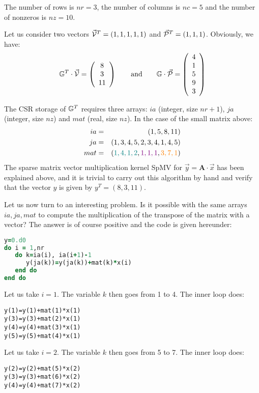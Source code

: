 The number of rows is $nr=3$, the number of columns is $nc=5$ and the number of nonzeros is 
$nz=10$.

Let us consider two vectors $\vec{\cal V}^T=(1,1,1,1,1)$ and $\vec{\cal P}^T=(1,1,1)$.
Obviously, we have:
\[
{{\mathbb{G}}}^T \cdot \vec{\cal V} = 
\left(
\begin{array}{c}
8\\3\\11
\end{array}
\right)
\qquad
\text{and}
\qquad
{{\mathbb{G}}} \cdot \vec{\cal P} = 
\left(
\begin{array}{c}
4 \\ 1\\ 5\\ 9\\ 3
\end{array}
\right)
\]

The CSR storage of ${{\mathbb{G}}}^T$ requires three arrays:
$ia$ (integer, size $nr+1$), $ja$ (integer, size $nz$) and $mat$ (real, size $nz$). 
In the case of the small matrix above:
\begin{eqnarray}
ia &=&(1,5,8,11)  \nonumber\\
ja &=&(1,3,4,5,2,3,4,1,4,5) \nonumber\\
mat&=&({\color{teal} 1,4,1,2},{\color{violet}1,1,1},{\color{orange}3,7,1}) \nonumber
\end{eqnarray}
The sparse matrix vector multiplication kernel SpMV for $\vec{y} = {\bm A}\cdot \vec{x}$ 
has been explained above, and it is trivial to carry out this algorithm by hand 
and verify that the vector $y$ is given by $y^T=(8,3,11)$.

Let us now turn to an interesting problem. Is it possible with the same arrays $ia,ja,mat$ to compute the 
multiplication of the transpose of the matrix with a vector? 
The answer is of course positive and the code is given hereunder:

\begin{lstlisting}[language=Fortran]
y=0.d0
do i = 1,nr
   do k=ia(i), ia(i+1)-1
      y(ja(k))=y(ja(k))+mat(k)*x(i)
   end do
end do
\end{lstlisting}

Let us take $i=1$. The variable $k$ then goes from 1 to 4. 
The inner loop does:
\begin{verbatim}
y(1)=y(1)+mat(1)*x(1)
y(3)=y(3)+mat(2)*x(1)
y(4)=y(4)+mat(3)*x(1)
y(5)=y(5)+mat(4)*x(1)
\end{verbatim}

Let us take $i=2$. The variable $k$ then goes from 5 to 7. 
The inner loop does:
\begin{verbatim}
y(2)=y(2)+mat(5)*x(2)
y(3)=y(3)+mat(6)*x(2)
y(4)=y(4)+mat(7)*x(2)
\end{verbatim}

